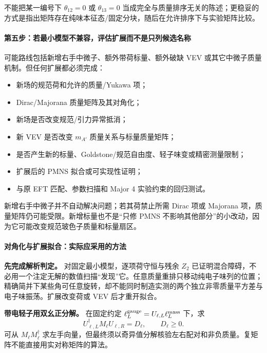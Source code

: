 \documentclass[
  chinese,
  UTF8]{ctexart}
\providecommand{\tightlist}{%
  \setlength{\itemsep}{0pt}\setlength{\parskip}{0pt}}
\begin{document}
不能把某一编号下 \(\theta_{12}=0\) 或 \(\theta_{13}=0\)
当成完全与质量排序无关的陈述；更稳妥的方式是指出矩阵存在纯味本征态/固定分块，随后在允许排序下与实验矩阵比较。

\paragraph{第五步：若最小模型不兼容，评估扩展而不是只列候选名称}\label{ux7b2cux4e94ux6b65ux82e5ux6700ux5c0fux6a21ux578bux4e0dux517cux5bb9ux8bc4ux4f30ux6269ux5c55ux800cux4e0dux662fux53eaux5217ux5019ux9009ux540dux79f0}

可能路线包括新增右手中微子、额外带荷标量、额外破缺 VEV
或其它中微子质量机制。但任何扩展都必须完成：

\begin{itemize}
\tightlist
\item
  新场的规范荷和允许的质量/Yukawa 项；
\item
  Dirac/Majorana 质量矩阵及其对角化；
\item
  新场是否改变规范/引力异常抵消；
\item
  新 VEV 是否改变 \(m_{A'}\) 质量关系与标量质量矩阵；
\item
  是否产生新的标量、Goldstone/规范自由度、轻子味变或精密测量限制；
\item
  扩展后的 PMNS 拟合或可实现性证明；
\item
  与原 EFT 匹配、参数扫描和 Major 4 实验约束的回归测试。
\end{itemize}

新增右手中微子并不自动解决问题；若其荷禁止所需 Dirac 项或 Majorana
项，质量矩阵仍可能受限。新增标量也不是``只修 PMNS
不影响其他部分''的小改动，因为它可能改变规范玻色子质量和标量扇区。

\paragraph{对角化与扩展拟合：实际应采用的方法}\label{ux5bf9ux89d2ux5316ux4e0eux6269ux5c55ux62dfux5408ux5b9eux9645ux5e94ux91c7ux7528ux7684ux65b9ux6cd5}

\textbf{先完成解析判定。} 对固定最小模型，逐项荷守恒与残余 \(Z_2\)
已证明混合障碍，不必用一个注定无解的数值扫描``发现''它。任意质量重排只移动纯电子味列的位置；精确简并下某些角可任意旋转，却不能同时制造实测的两个独立非零质量平方差与电子味振荡。扩展改变荷或
VEV 后才重开拟合。

\textbf{带电轻子用双幺正分解。} 在固定约定
\(\ell_L^{\rm gauge}=U_{\ell,L}\ell_L^{\rm mass}\) 下，求 \[
U_{\ell,L}^\dagger M_\ell U_{\ell,R}=D_\ell,\qquad D_\ell\ge0.
\] 可从 \(M_\ell M_\ell^\dagger\)
求左手向量，但最终须以奇异值分解核验左右配对和非负质量。复矩阵不能直接用实对称矩阵的算法。
\end{document}
